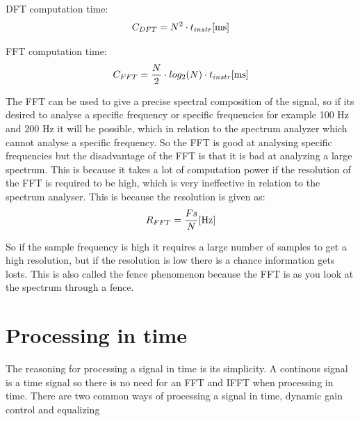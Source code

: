 
DFT computation time:
\begin{equation}
C_{DFT} = N^{2}\cdot t_{instr} \enhed{ms}
\end{equation}
\begin{where}
\end{where}

FFT computation time:
\begin{equation}
C_{FFT} = \frac{N}{2}\cdot log_{2}(N)\cdot t_{instr} \enhed{ms}
\end{equation}
\begin{where}
\end{where}

The FFT can be used to give a precise spectral composition of the signal, so if its desired to analyse a specific frequency or specific frequencies for example 100 Hz and 200 Hz it will be possible, which in relation to the spectrum analyzer which cannot analyse a specific frequency. So the FFT is good at analysing specific frequencies but the disadvantage of the FFT is that it is bad at analyzing a large spectrum. This is because it takes a lot of computation power if the resolution of the FFT is required to be high, which is very ineffective in relation to the spectrum analyser. This is because the resolution is given as:
\begin{equation}
R_{FFT} = \frac{Fs}{N} \enhed{Hz}
\end{equation}
\begin{where}
\end{where} 

So if the sample frequency is high it requires a large number of samples to get a high resolution, but if the resolution is low there is a chance information gets losts. This is also called the fence phenomenon because the FFT is as you look at the spectrum through a fence. 









\section{Processing in time}
The reasoning for processing a signal in time is its simplicity. A continous signal is a time signal so there is no need for an FFT and IFFT when processing in time. There are two common ways of processing a signal in time, dynamic gain control and equalizing  


